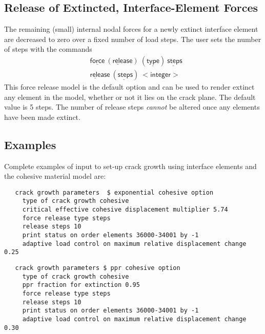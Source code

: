 \documentclass[11pt]{report}
\numberwithin{equation}{section}
\newcommand{\ul} {\underline}
\newcommand{\hv} {\mathsf}   %
\newcommand{\ti}{\emph}
\begin{document}
\subsection{Release of Extincted, Interface-Element Forces}
The remaining (small) internal nodal forces for a 
newly extinct interface element are decreased to zero over a fixed
number of load steps. The user sets the number of steps with the commands
\begin{align*}
&\hv{ \ul{force}\ (\ul{rele}ase)\ (\ul{type})\ \ul{step}s} \\
&\hv{\ul{rele}ase\ (\ul{step}s)\ <integer>} 
\end{align*}
This force release model is the default option and can be used to render extinct
any element in the model, whether or not it lies on the crack plane. The default
value is 5 steps. The number of release steps \ti{cannot} be altered once any
elements have been made extinct.
%
%
\subsection{Examples}
Complete examples of input to set-up crack growth using 
interface elements and the cohesive material model are:
\small
\begin{verbatim}
   crack growth parameters  $ exponential cohesive option
     type of crack growth cohesive
     critical effective cohesive displacement multiplier 5.74
     force release type steps
     release steps 10
     print status on order elements 36000-34001 by -1
     adaptive load control on maximum relative displacement change 0.25
\end{verbatim}
\normalsize
\small
\begin{verbatim}
   crack growth parameters $ ppr cohesive option
     type of crack growth cohesive
     ppr fraction for extinction 0.95
     force release type steps
     release steps 10
     print status on order elements 36000-34001 by -1
     adaptive load control on maximum relative displacement change 0.30
\end{verbatim}
\normalsize
\end{document}
